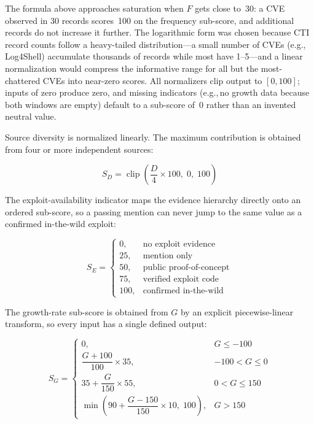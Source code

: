 \documentclass[conference]{IEEEtran}
\begin{document}
The formula above approaches saturation when $F$ gets close to~30: a CVE observed in 30 records scores~100 on the frequency sub-score, and additional records do not increase it further. The logarithmic form was chosen because CTI record counts follow a heavy-tailed distribution---a small number of CVEs (e.g.,\,Log4Shell) accumulate thousands of records while most have 1--5---and a linear normalization would compress the informative range for all but the most-chattered CVEs into near-zero scores. All normalizers clip output to $[0,100]$; inputs of zero produce zero, and missing indicators (e.g.,\,no growth data because both windows are empty) default to a sub-score of~0 rather than an invented neutral value.

Source diversity is normalized linearly. The maximum contribution is obtained from four or more independent sources:

\begin{equation}
S_D =
\operatorname{clip}
\left(
\frac{D}{4}\times100,\;0,\;100
\right)
\tag{4}
\end{equation}

The exploit-availability indicator maps the evidence hierarchy directly onto an ordered sub-score, so a passing mention can never jump to the same value as a confirmed in-the-wild exploit:

\begin{equation}
S_E =
\begin{cases}
0,   & \text{no exploit evidence}\\
25,  & \text{mention only}\\
50,  & \text{public proof-of-concept}\\
75,  & \text{verified exploit code}\\
100, & \text{confirmed in-the-wild}
\end{cases}
\tag{5}
\end{equation}

The growth-rate sub-score is obtained from $G$ by an explicit piecewise-linear transform, so every input has a single defined output:

\begin{equation}
S_G =
\begin{cases}
0, & G \le -100\\[2pt]
\dfrac{G+100}{100}\times 35, & -100 < G \le 0\\[4pt]
35 + \dfrac{G}{150}\times 55, & 0 < G \le 150\\[4pt]
\min\!\left(90 + \dfrac{G-150}{150}\times 10,\;100\right), & G > 150
\end{cases}
\tag{6}
\end{equation}
\end{document}
